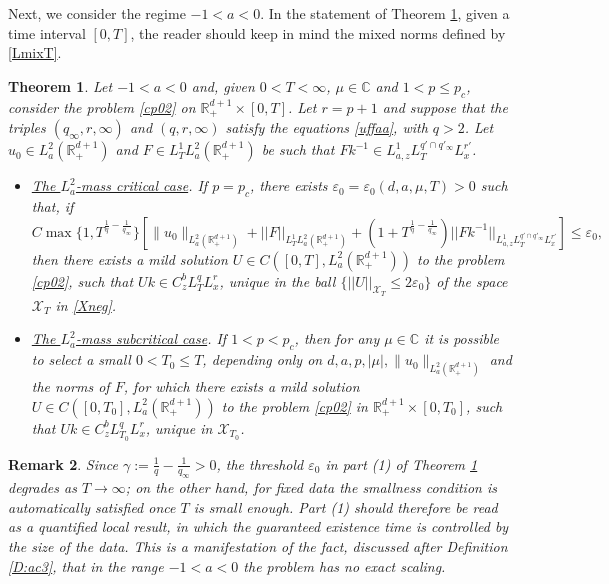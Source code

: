 \documentclass[11pt,letter]{amsart}
\def \RN {\mathbb{R}_+^{d+1}}
\numberwithin{equation}{section}
\newcommand{\ve}{\varepsilon}
\newcommand{\XT}{\mathcal{X}_T}
\newcommand{\C}{\mathbb{C}}
\newtheorem{theorem}{Theorem}[section]
\newtheorem{remark}[theorem]{Remark}
\numberwithin{equation}{section}
\begin{document}
\vskip 0.2in

Next, we consider the regime $-1<a<0$. In the statement of Theorem \ref{T:nega}, given a time interval $[0,T]$, the reader should keep in mind the mixed norms defined by \eqref{LmixT}.

\begin{theorem}\label{T:nega}
Let $-1<a<0$ and, given $0<T<\infty$, $\mu\in \C$ and $1<p\le p_c$, consider the problem \eqref{cp02} on $\RN\times[0,T]$. Let $r = p+1$ and suppose that the triples $(q_\infty,r,\infty)$ and $(q,r,\infty)$ satisfy the equations \eqref{uffaa}, with $q>2$. Let $u_0\in L^2_a(\RN)$ and $F\in L^1_T L^2_a(\RN)$ be such that 
$F  k^{-1}\in L^1_{a,z} L^{q'\cap q'_\infty}_T L^{r'}_x $.
\begin{itemize}
\item[(1)] \underline{\emph{The $L^2_a$-mass critical case}}. 
If $p=p_c$, there exists $\ve_0 = \ve_0(d,a,\mu,T)>0$ such that, if   
\[
 C \max\{1,T^{\frac{1}{q}-\frac{1}{q_\infty}}\} \left[\|u_0\|_{L^2_a(\RN)} + ||F||_{L^1_T L^2_a(\RN)} + (1+T^{\frac{1}{q}-\frac{1}{q_\infty}}) ||F k^{-1}||_{L^1_{a,z} L^{q'\cap q'_\infty}_T L^{r'}_x}\right]\le \varepsilon_0,
\]
then there exists a mild solution $U\in C([0,T],L^2_a(\RN))$ to the problem \eqref{cp02}, such that $U k\in C^b_z L^q_T L^r_x$, unique in the ball $\{||U||_{\XT}\le 2\ve_0\}$ of the space $\XT$ in \eqref{Xneg}.
\item[(2)] \underline{\emph{The $L^2_a$-mass subcritical case}}. If $1<p<p_c$, then for any $\mu\in \C$ it is possible to select a small $0<T_0\le T$, depending only on $d, a, p, |\mu|, \|u_0\|_{L^2_a(\RN)}$ and the norms of $F$, for which there exists a mild solution $U\in C([0,T_0],L^2_a(\RN))$ to the problem \eqref{cp02} in $\RN\times [0,T_0]$, such that $U k\in C^b_z L^q_{T_0} L^r_x$, unique in $\mathcal X_{T_0}$.
\end{itemize}
\end{theorem}

\begin{remark}\label{R:critnega}
Since $\gamma := \frac 1q - \frac{1}{q_\infty}>0$, the threshold $\ve_0$ in part (1) of Theorem \ref{T:nega} degrades as $T\to\infty$; on the other hand, for fixed data the smallness condition is automatically satisfied once $T$ is small enough. Part (1) should therefore be read as a quantified local result, in which the guaranteed existence time is controlled by the size of the data. This is a manifestation of the fact, discussed after Definition \ref{D:ac3}, that in the range $-1<a<0$ the problem has no exact scaling.
\end{remark}
\end{document}
